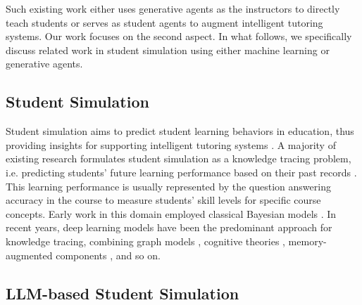 Such existing work either uses generative agents as the instructors to directly teach students \cite{zhang2024mathemyths} or serves as student agents \cite{markel2023gpteach} to augment intelligent tutoring systems. 
Our work focuses on the second aspect. In what follows, we specifically discuss related work in student simulation using either machine learning or generative agents.


\subsection{Student Simulation}

Student simulation aims to predict student learning behaviors in education, thus providing insights for supporting intelligent tutoring systems \cite{graesser2012intelligent}. A majority of existing research formulates student simulation as a knowledge tracing problem, i.e. predicting students' future learning performance based on their past records  \cite{abdelrahman2023knowledge}. This learning performance is usually represented by the question answering accuracy in the course to measure students' skill levels for specific course concepts. Early work in this domain employed classical Bayesian models \cite{yudelson2013individualized}. In recent years, deep learning models \cite{piech2015deepknowledgetracing} have been the predominant approach for knowledge tracing, combining graph models \cite{nakagawa2019graph}, cognitive theories \cite{zhou2024predictivescalableinterpretableknowledge}, memory-augmented components \cite{zhang2017dynamickeyvaluememorynetworks}, and so on.

\subsection{LLM-based Student Simulation}

